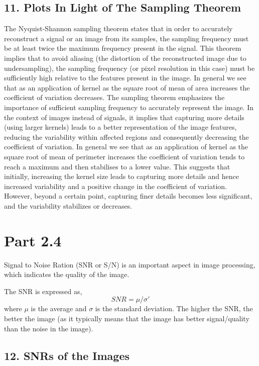 \documentclass[runningheads]{llncs}
\begin{document}
\subsection*{11. Plots In Light of The Sampling Theorem}
The Nyquist-Shannon sampling theorem states that in order to accurately reconstruct a signal or an image from its samples, the sampling frequency must be at least twice the maximum frequency present in the signal. This theorem implies that to avoid aliasing (the distortion of the reconstructed image due to undersampling), the sampling frequency (or pixel resolution in this case) must be sufficiently high relative to the features present in the image. \newline
In general we see that  as an application of kernel as the square root of mean of area increases the coefficient of variation decreases. The sampling theorem emphasizes the importance of sufficient sampling frequency to accurately represent the image. In the context of images instead of signals, it implies that capturing more details (using larger kernels) leads to a better representation of the image features, reducing the variability within affected regions and consequently decreasing the coefficient of variation. \newline
In general we see that  as an application of kernel as the square root of mean of perimeter increases the coefficient of variation tends to reach a maximum and then stabilises to a lower value. This suggests that initially, increasing the kernel size leads to capturing more details and hence increased variability and a positive change in the coefficient of variation. However, beyond a certain point, capturing finer details becomes less significant, and the variability stabilizes or decreases.


\newpage

\section*{Part 2.4}
Signal to Noise Ration (SNR or S/N) is an important aspect in image processing, which indicates the quality of the image. 

The SNR is expressed as, 
\begin{equation*}
    SNR = \mu/\sigma'
\end{equation*}
where $\mu$ is the average 
and $\sigma$ is the standard deviation. 
The higher the SNR, the better the image (as it typically means that the image has better signal/quality than the noise in the image). \subsection*{12. SNRs of the Images}
\end{document}
